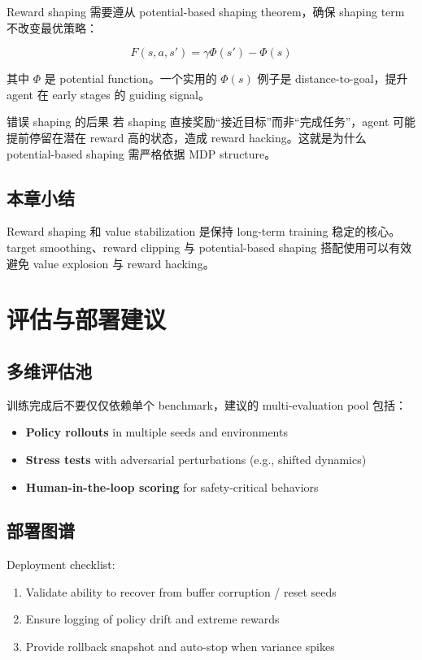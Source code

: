 \documentclass[a4paper]{article}
\begin{document}
Reward shaping 需要遵从 potential-based shaping theorem，确保 shaping term 不改变最优策略：

$$F(s, a, s') = \gamma \Phi(s') - \Phi(s)$$

其中 $\Phi$ 是 potential function。一个实用的 $\Phi(s)$ 例子是 distance-to-goal，提升 agent 在 early stages 的 guiding signal。

\begin{warningbox}{错误 shaping 的后果}
若 shaping 直接奖励“接近目标”而非“完成任务”，agent 可能提前停留在潜在 reward 高的状态，造成 reward hacking。这就是为什么 potential-based shaping 需严格依据 MDP structure。
\end{warningbox}

\subsection{本章小结}

Reward shaping 和 value stabilization 是保持 long-term training 稳定的核心。target smoothing、reward clipping 与 potential-based shaping 搭配使用可以有效避免 value explosion 与 reward hacking。

\section{评估与部署建议}

\subsection{多维评估池}

训练完成后不要仅仅依赖单个 benchmark，建议的 multi-evaluation pool 包括：

\begin{itemize}
    \item \textbf{Policy rollouts} in multiple seeds and environments
    \item \textbf{Stress tests} with adversarial perturbations (e.g., shifted dynamics)
    \item \textbf{Human-in-the-loop scoring} for safety-critical behaviors
\end{itemize}

\subsection{部署图谱}

Deployment checklist:

\begin{enumerate}
    \item Validate ability to recover from buffer corruption / reset seeds
    \item Ensure logging of policy drift and extreme rewards
    \item Provide rollback snapshot and auto-stop when variance spikes
\end{enumerate}
\end{document}
